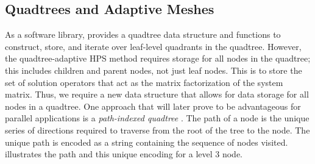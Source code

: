 \subsection{Quadtrees and Adaptive Meshes}

As a software library, \pforest provides a quadtree data structure and functions to construct, store, and iterate over leaf-level quadrants in the quadtree.  However, the quadtree-adaptive HPS method requires storage for all nodes in the quadtree; this includes children and parent nodes, not just leaf nodes. This is to store the set of solution operators that act as the matrix factorization of the system matrix. Thus, we require a new data structure that allows for data storage for all nodes in a quadtree. One approach that will later prove to be advantageous for parallel applications is a {\em path-indexed quadtree} \citep{woodward1982explicit,samet1984quadtree}. The path of a node is the unique series of directions required to traverse from the root of the tree to the node. The unique path is encoded as a string containing the sequence of nodes visited.   illustrates the path and this unique encoding for a level 3 node.

